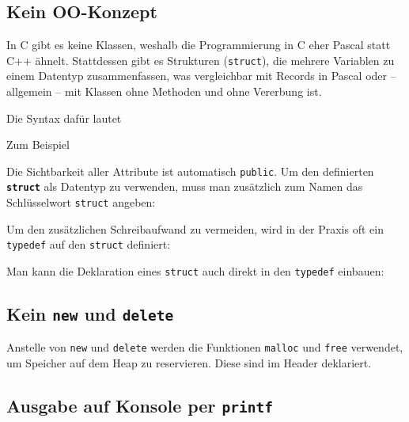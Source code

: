 \subsection{Kein OO-Konzept}
In C gibt es keine Klassen, weshalb die Programmierung in C eher Pascal statt C++ ähnelt.
Stattdessen gibt es Strukturen (\lstinline{struct}), die mehrere Variablen zu einem Datentyp zusammenfassen, was vergleichbar mit Records in Pascal oder -- allgemein -- mit Klassen ohne Methoden und ohne Vererbung ist.

Die Syntax dafür lautet


Zum Beispiel


Die Sichtbarkeit aller Attribute ist automatisch \lstinline{public}.
Um den definierten \textbf{\lstinline|struct|} als Datentyp zu verwenden, muss man zusätzlich zum Namen das Schlüsselwort \lstinline{struct} angeben:


Um den zusätzlichen Schreibaufwand zu vermeiden, wird in der Praxis oft ein \lstinline{typedef} auf den \lstinline{struct} definiert:


Man kann die Deklaration eines \lstinline{struct} auch direkt in den \lstinline{typedef} einbauen:


\subsection{Kein \lstinline{new} und \lstinline{delete}}

Anstelle von \lstinline{new} und \lstinline{delete} werden die Funktionen \lstinline{malloc} und \lstinline{free} verwendet, um Speicher auf dem Heap zu reservieren.
Diese sind im Header  deklariert.


\subsection{Ausgabe auf Konsole per \lstinline{printf}}

